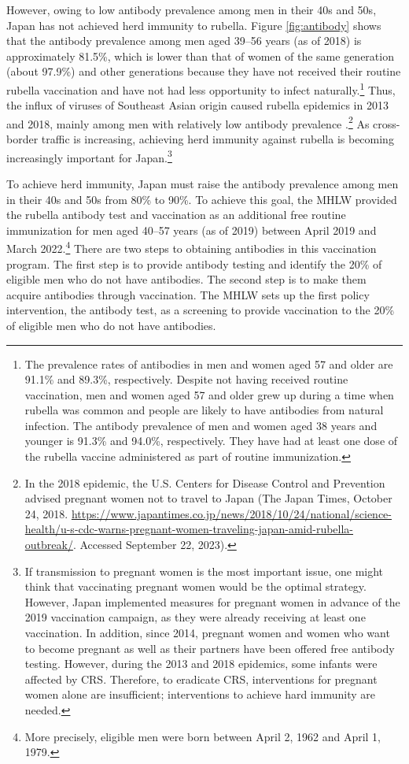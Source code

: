 \documentclass[
  11pt,
  a4paper
]{article}
\begin{document}
However, owing to low antibody prevalence among men in their 40s and 50s, Japan has not achieved herd immunity to rubella. Figure \ref{fig:antibody} shows that the antibody prevalence among men aged 39--56 years (as of 2018) is approximately 81.5\%, which is lower than that of women of the same generation (about 97.9\%) and other generations because they have not received their routine rubella vaccination and have not had less opportunity to infect naturally.\footnote{The prevalence rates of antibodies in men and women aged 57 and older are 91.1\% and 89.3\%, respectively. Despite not having received routine vaccination, men and women aged 57 and older grew up during a time when rubella was common and people are likely to have antibodies from natural infection. The antibody prevalence of men and women aged 38 years and younger is 91.3\% and 94.0\%, respectively. They have had at least one dose of the rubella vaccine administered as part of routine immunization.} Thus, the influx of viruses of Southeast Asian origin caused rubella epidemics in 2013 and 2018, mainly among men with relatively low antibody prevalence \citep{NIID2019}.\footnote{In the 2018 epidemic, the U.S. Centers for Disease Control and Prevention advised pregnant women not to travel to Japan (The Japan Times, October 24, 2018. \url{https://www.japantimes.co.jp/news/2018/10/24/national/science-health/u-s-cdc-warns-pregnant-women-traveling-japan-amid-rubella-outbreak/}. Accessed September 22, 2023).} As cross-border traffic is increasing, achieving herd immunity against rubella is becoming increasingly important for Japan.\footnote{If transmission to pregnant women is the most important issue, one might think that vaccinating pregnant women would be the optimal strategy. However, Japan implemented measures for pregnant women in advance of the 2019 vaccination campaign, as they were already receiving at least one vaccination. In addition, since 2014, pregnant women and women who want to become pregnant as well as their partners have been offered free antibody testing. However, during the 2013 and 2018 epidemics, some infants were affected by CRS. Therefore, to eradicate CRS, interventions for pregnant women alone are insufficient; interventions to achieve hard immunity are needed.}

To achieve herd immunity, Japan must raise the antibody prevalence among men in their 40s and 50s from 80\% to 90\%. To achieve this goal, the MHLW provided the rubella antibody test and vaccination as an additional free routine immunization for men aged 40--57 years (as of 2019) between April 2019 and March 2022.\footnote{More precisely, eligible men were born between April 2, 1962 and April 1, 1979.} There are two steps to obtaining antibodies in this vaccination program. The first step is to provide antibody testing and identify the 20\% of eligible men who do not have antibodies. The second step is to make them acquire antibodies through vaccination. The MHLW sets up the first policy intervention, the antibody test, as a screening to provide vaccination to the 20\% of eligible men who do not have antibodies.
\end{document}
